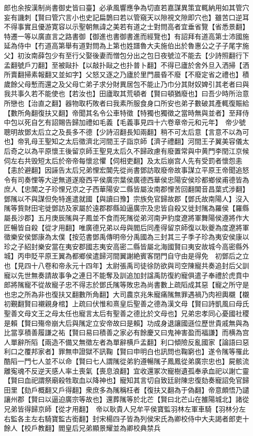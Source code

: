 郎也余按漢制尚書御史皆曰臺】必承風響應争為切直若嘉謀異策宜輒納用如其管穴妄有譏刺【賢曰管穴言小也史記扁鵲曰若以管窺天以隙視文隙即穴也】雖苦口逆耳不得事實且優游寛容以示聖朝無諱之美若有道之士對問高者宜垂省覽【省悉景翻】特遷一等以廣直言之路書御【御進也書御書進而經覽也】有詔拜有道高第士沛國施延為侍中【冇道高第舉有道對問為上第也姓譜魯大夫施伯出於魯惠公之子子尾字施父】初汝南薛包少有至行父娶後妻而憎包分出之包日夜號泣不能去【少詩照翻行下孟翻號戶刀翻】至被敺扑【以敲扑敺之也扑普卜翻】不得已廬於舍外旦入洒掃【洒所賣翻掃素報翻又並如字】父怒又逐之乃廬於里門晨昏不廢【不廢定省之禮也】積歲餘父母慙而還之及父母亡弟子求分財異居包不能止乃巾分其財奴婢引其老者曰與我共事久若不能使也【若汝也】田廬取其荒頓者【賢曰頓猶廢也】曰吾少時所治意所戀也【治直之翻】器物取朽敗者曰我素所服食身口所安也弟子數破其產輒復賑給【數所角翻復扶又翻】帝聞其名令公車特徵【特獨也獨徵之當時無與並者】至拜侍中包以死自乞有詔賜告歸加禮如毛義【毛義事見四十六卷章帝元和元年】　帝少號聰明故鄧太后立之及長多不德【少詩沼翻長知兩翻】稍不可太后意【言意不以為可也】帝乳母王聖知之太后徵濟北河間王子詣京師【濟子禮翻】河間王子翼美容儀太后奇之以為平原懷王後留京師王聖見太后久不歸政慮有廢置常與中黄門李閏江京候伺左右共毁短太后於帝帝每懷忿懼【伺相吏翻】及太后崩宫人先有受罰者懷怨恚【恚於避翻】因誣告太后兄弟悝宏閶先從尚書鄧訪取廢帝故事謀立平原王帝聞追怒令有司奏悝等大逆無道遂廢西平侯廣宗葉侯廣德西華侯忠陽安侯珍都鄉侯甫德皆為庶人【忠閶之子珍悝兄京之子西華陽安二縣皆屬汝南郡悝苦回翻閶音昌葉式涉翻】鄧隲以不與謀但免特進遣就國【與讀曰豫】宗族免官歸故郡【鄧氏故南陽人】沒入隲等貲財田宅徙鄧訪及家屬於遠郡郡縣廹逼廣宗及忠皆自殺又徙封隲為羅侯【羅縣屬長沙郡】五月庚辰隲與子鳳並不食而死隲從弟河南尹豹度遼將軍舞陽侯遵將作大匠暢皆自殺【從才用翻】唯廣德兄弟以母與閻后同產得留京師復以耿夔為度遼將軍徵樂安侯鄧康為太僕【按范書鄧禹傳明帝分禹國為三封其三子季子珍為夷安侯康以珍之子紹封樂安當在夷安郡國志夷安高密二縣皆屬北海國賢曰夷安故城今高密縣外城】丙申貶平原王翼為都鄉侯遣歸河間翼謝絶賓客閉門自守由是得免　初鄧后之立也【見四十八卷和帝永元十四年】太尉張禹司徒徐防欲與司空陳寵共奏追封后父訓寵以先世無奏請故事争之連日不能奪及訓追加封諡禹防復約寵俱遣子奉禮於虎賁中郎將隲寵不從故寵子忠不得志於鄧氏隲等敗忠為尚書數上疏䧟成其惡【寵之所守是也忠之所為非也復扶又翻數所角翻】大司農京兆朱寵痛隲無罪遇禍乃肉袒輿櫬【櫬初覲翻賢曰襯親身棺】上疏曰伏惟和熹皇后聖善之德為漢文母【賢曰詩凱風曰母氏聖善文母文王之母太任也寵言太后有聖善之德比於文母也】兄弟忠孝同心憂國社稷是賴【賢曰殤帝崩大后與隲定立安帝故曰是賴】功成身退讓國遜位歷世貴戚無與為比當享積善履謙之祐【賢曰易曰積善之家必有餘慶又曰鬼神害盈而福謙】而横為宫人單辭所䧟【兩造不備又無徵左者為單辭横戶孟翻】利口傾險反亂國家【論語曰惡利口之覆邦家者】罪無申證獄不訊鞠【賢曰申明白也訊問也鞠窮也】遂令隲等罹此酷䧟一門七人並不以命【賢曰七人謂隲從弟豹遵暢隲子鳳鳳從弟廣宗忠也】屍骸流離寃魂不反逆天感人率土喪氣【喪息浪翻】宜收還冢次寵樹遺孤奉承血祀以謝亡靈【賢曰血祀謂祭廟殺牲取血以降神也】寵知其言切自致廷尉陳忠復劾奏寵詔免官歸田里【劾戶概翻又戶得翻】衆庶多為隲稱枉者【復扶又翻為于偽翻】帝意頗悟乃譴讓州郡【賢曰以逼迫廣宗等故也】還葬隲等於北芒【賢曰北芒山在雒陽城北】諸從兄弟皆得歸京師【從才用翻】　帝以耿貴人兄牟平侯寶監羽林左軍車騎【羽林分左右監各主左右騎寶監古銜翻】封宋楊四子皆為列侯宋氏為卿校侍中大夫謁者郎吏十餘人【校戶教翻】閻皇后兄弟顯景耀並為卿校典禁兵